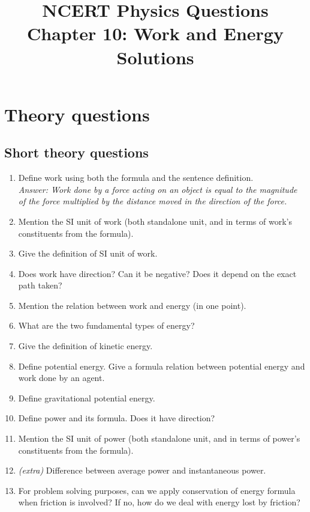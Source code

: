\documentclass[12pt]{article}
\title{NCERT Physics Questions \\ Chapter 10: Work and Energy \\ Solutions}
\author{}
\date{}
\begin{document}
\maketitle

\section*{Theory questions}
\subsection*{Short theory questions}
\begin{enumerate}
	\item Define work using both the formula and the sentence definition. \\
		\textit{Answer: Work done by a force acting on an object is equal to the magnitude of the force multiplied by the distance moved in the direction of the force.}


	\item Mention the SI unit of work (both standalone unit, and in terms of work's constituents from the formula).
	\item Give the definition of SI unit of work.
	\item Does work have direction? Can it be negative? Does it depend on the exact path taken?
	\item Mention the relation between work and energy (in one point).
	\item What are the two fundamental types of energy?
	\item Give the definition of kinetic energy.
	\item Define potential energy. Give a formula relation between potential energy and work done by an agent.
	\item Define gravitational potential energy.
	\item Define power and its formula. Does it have direction?
	\item Mention the SI unit of power (both standalone unit, and in terms of power's constituents from the formula).
	\item \textit{(extra)} Difference between average power and instantaneous power.
	\item For problem solving purposes, can we apply conservation of energy formula when friction is involved? If no, how do we deal with energy lost by friction?
\end{enumerate}
\end{document}
